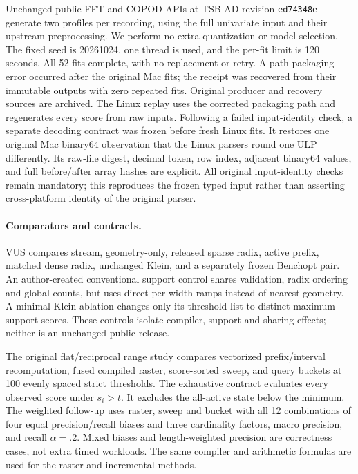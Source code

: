 Unchanged public FFT and COPOD APIs at TSB-AD revision \texttt{ed74348e}
generate two profiles per recording, using the full univariate input and their
upstream preprocessing. We perform no extra quantization or model selection.
The fixed seed is 20261024, one thread is used, and the per-fit limit is 120
seconds. All 52 fits complete, with no replacement or retry. A path-packaging
error occurred after the original Mac fits; the receipt was recovered from
their immutable outputs with zero repeated fits. Original producer and recovery
sources are archived. The Linux replay uses the corrected packaging path and
regenerates every score from raw inputs. Following a failed input-identity
check, a separate decoding contract was frozen before fresh Linux fits. It
restores one original Mac binary64 observation that the Linux parsers round
one ULP differently. Its raw-file digest, decimal token, row index, adjacent
binary64 values, and full before/after array hashes are explicit. All original
input-identity checks remain mandatory; this reproduces the frozen typed
input rather than asserting cross-platform identity of the original parser.

\paragraph{Comparators and contracts.}
VUS compares stream, geometry-only, released sparse radix, active prefix,
matched dense radix, unchanged Klein, and a separately frozen Benchopt pair.
An author-created conventional support control shares validation, radix
ordering and global counts, but uses direct per-width ramps instead of nearest
geometry. A minimal Klein ablation changes only its threshold list to distinct
maximum-support scores. These controls isolate compiler, support and sharing
effects; neither is an unchanged public release.

The original flat/reciprocal range study compares vectorized prefix/interval
recomputation, fused compiled raster, score-sorted sweep, and query buckets at
100 evenly spaced strict thresholds. The exhaustive contract evaluates every
observed score under $s_i>t$. It excludes the all-active state below the minimum.
The weighted follow-up uses raster, sweep and bucket with all 12 combinations
of four equal precision/recall biases and three cardinality factors, macro
precision, and recall $\alpha=.2$. Mixed biases and length-weighted precision
are correctness cases, not extra timed workloads. The same compiler and
arithmetic formulas are used for the raster and incremental methods.

